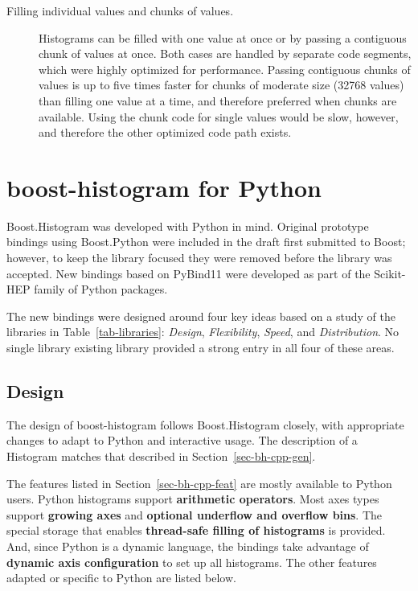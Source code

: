 \documentclass{webofc}
\begin{document}
\begin{description}
\item[Filling individual values and chunks of values.] Histograms can be filled with one value at once or by passing a contiguous chunk of values at once. Both cases are handled by separate code segments, which were highly optimized for performance. Passing contiguous chunks of values is up to five times faster for chunks of moderate size (32768 values) than filling one value at a time, and therefore preferred when chunks are available. Using the chunk code for single values would be slow, however, and therefore the other optimized code path exists.
\end{description}

\section{boost-histogram for Python}
\label{sec-bhp-intro}

Boost.Histogram was developed with Python in mind. Original prototype bindings using Boost.Python were included in the draft first submitted to Boost; however, to keep the library focused they were removed before the library was accepted. New bindings based on PyBind11 were developed as part of the Scikit-HEP family of Python packages.

The new bindings were designed around four key ideas based on a study of the libraries in Table~\ref{tab-libraries}: \emph{Design}, \emph{Flexibility}, \emph{Speed}, and \emph{Distribution}. No single library existing library provided a strong entry in all four of these areas.

\subsection{Design}
\label{sec-bhp-design}

The design of boost-histogram follows Boost.Histogram closely, with appropriate changes to adapt to Python and interactive usage. The description of a Histogram matches that described in Section~\ref{sec-bh-cpp-gen}.

The features listed in Section~\ref{sec-bh-cpp-feat} are mostly available to Python users. Python histograms support \textbf{arithmetic operators}. Most axes types support \textbf{growing axes} and \textbf{optional underflow and overflow bins}. The special storage that enables \textbf{thread-safe filling of histograms} is provided. And, since Python is a dynamic language, the bindings take advantage of \textbf{dynamic axis configuration} to set up all histograms. The other features adapted or specific to Python are listed below.
\end{document}
